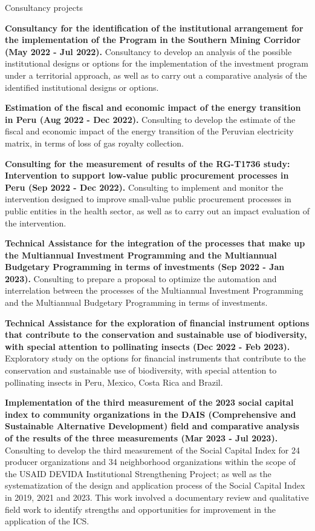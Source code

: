 \documentclass{resume} %
\begin{document}
\pagebreak
\begin{rSection}{Consultancy projects}
\item \textbf{Consultancy for the identification of the institutional arrangement for the implementation of the Program in the Southern Mining Corridor (May 2022 - Jul 2022).} {Consultancy to develop an analysis of the possible institutional designs or options for the implementation of the investment program under a territorial approach, as well as to carry out a comparative analysis of the identified institutional designs or options.}
\item \textbf{Estimation of the fiscal and economic impact of the energy transition in Peru (Aug 2022 - Dec 2022).} {Consulting to develop the estimate of the fiscal and economic impact of the energy transition of the Peruvian electricity matrix, in terms of loss of gas royalty collection.}
\item \textbf{Consulting for the measurement of results of the RG-T1736 study: Intervention to support low-value public procurement processes in Peru (Sep 2022 - Dec 2022).} {Consulting to implement and monitor the intervention designed to improve small-value public procurement processes in public entities in the health sector, as well as to carry out an impact evaluation of the intervention.}
\item \textbf{Technical Assistance for the integration of the processes that make up the Multiannual Investment Programming and the Multiannual Budgetary Programming in terms of investments (Sep 2022 - Jan 2023).} {Consulting to prepare a proposal to optimize the automation and interrelation between the processes of the Multiannual Investment Programming and the Multiannual Budgetary Programming in terms of investments.}
\item \textbf{Technical Assistance for the exploration of financial instrument options that contribute to the conservation and sustainable use of biodiversity, with special attention to pollinating insects (Dec 2022 - Feb 2023).} {Exploratory study on the options for financial instruments that contribute to the conservation and sustainable use of biodiversity, with special attention to pollinating insects in Peru, Mexico, Costa Rica and Brazil.}
\item \textbf{Implementation of the third measurement of the 2023 social capital index to community organizations in the DAIS (Comprehensive and Sustainable Alternative Development) field and comparative analysis of the results of the three measurements (Mar 2023 - Jul 2023).} {Consulting to develop the third measurement of the Social Capital Index for 24 producer organizations and 34 neighborhood organizations within the scope of the USAID DEVIDA Institutional Strengthening Project; as well as the systematization of the design and application process of the Social Capital Index in 2019, 2021 and 2023. This work involved a documentary review and qualitative field work to identify strengths and opportunities for improvement in the application of the ICS.}

\end{rSection}
\end{document}
